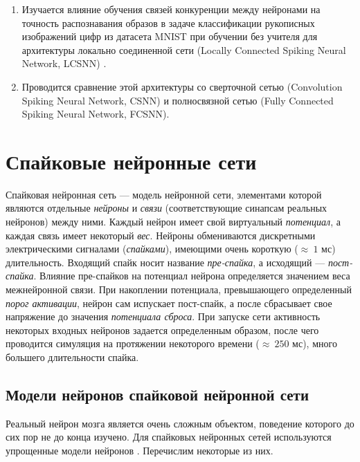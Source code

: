 \documentclass[a4paper]{article}
\begin{document}
\begin{enumerate}
\item Изучается влияние обучения связей конкуренции \cite{MaxActiv1, MaxActiv2, hardware_survey} между нейронами на точность распознавания образов в задаче классификации рукописных изображений цифр из датасета MNIST \cite{MNIST} при обучении без учителя для архитектуры локально соединенной сети (Locally Connected Spiking Neural Network, LCSNN) \cite{saunders2019locally}.

\item Проводится сравнение этой архитектуры со сверточной сетью (Convolution Spiking Neural Network, CSNN) и полносвязной сетью (Fully Connected Spiking Neural Network, FCSNN).

\end{enumerate}

\clearpage 

\section{Спайковые нейронные сети}
Спайковая нейронная сеть --- модель нейронной сети, элементами которой являются  отдельные \textit{нейроны} и \textit{связи} (соответствующие синапсам реальных нейронов) между ними. Каждый нейрон имеет свой виртуальный \textit{потенциал}, а каждая связь имеет некоторый \textit{вес}. Нейроны обмениваются дискретными электрическими сигналами (\textit{спайками}), имеющими очень короткую ($ \approx ~1$ мс) длительность. Входящий спайк носит название \textit{пре-спайка}, а исходящий --- \textit{пост-спайка}.  Влияние пре-спайков на потенциал нейрона определяется значением веса межнейронной связи. При накоплении потенциала, превышающего определенный \textit{порог активации}, нейрон сам испускает пост-спайк, а после сбрасывает свое напряжение до значения \textit{потенциала сброса}. При запуске сети активность некоторых входных нейронов задается определенным образом, после чего проводится симуляция на протяжении некоторого времени ($\approx ~250$ мс), много большего длительности спайка.

\subsection{Модели нейронов спайковой нейронной сети}
Реальный нейрон мозга является очень сложным объектом, поведение которого до сих пор не до конца изучено. Для спайковых нейронных сетей используются упрощенные модели нейронов \cite{neuronmodels}. Перечислим некоторые из них.
\end{document}

